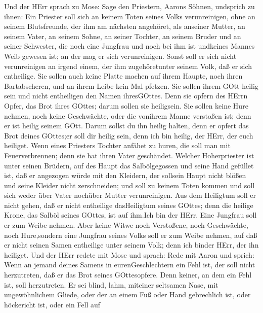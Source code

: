  Und der HErr sprach zu Mose: Sage den Priestern, Aarons
Söhnen, undsprich zu ihnen: Ein Priester soll sich an keinem Toten
seines Volks verunreinigen,  ohne an seinem Blutsfreunde,
der ihm am nächsten angehöret, als anseiner Mutter, an seinem Vater, an
seinem Sohne, an seiner Tochter, an seinem Bruder  und an
seiner Schwester, die noch eine Jungfrau und noch bei ihm ist undkeines
Mannes Weib gewesen ist; an der mag er sich verunreinigen. 
Sonst soll er sich nicht verunreinigen an irgend einem, der ihm
zugehöretunter seinem Volk, daß er sich entheilige.  Sie
sollen auch keine Platte machen auf ihrem Haupte, noch ihren
Bartabscheren, und an ihrem Leibe kein Mal pfetzen.  Sie
sollen ihrem GOtt heilig sein und nicht entheiligen den Namen
ihresGOttes. Denn sie opfern des HErrn Opfer, das Brot ihres GOttes;
darum sollen sie heiligsein.  Sie sollen keine Hure nehmen,
noch keine Geschwächte, oder die vonihrem Manne verstoßen ist; denn er
ist heilig seinem GOtt.  Darum sollst du ihn heilig halten,
denn er opfert das Brot deines GOttes;er soll dir heilig sein, denn ich
bin heilig, der HErr, der euch heiliget.  Wenn eines
Priesters Tochter anfähet zu huren, die soll man mit Feuerverbrennen;
denn sie hat ihren Vater geschändet.  Welcher Hoherpriester
ist unter seinen Brüdern, auf des Haupt das Salbölgegossen und seine
Hand gefüllet ist, daß er angezogen würde mit den Kleidern, der sollsein
Haupt nicht blößen und seine Kleider nicht zerschneiden; 
und soll zu keinem Toten kommen und soll sich weder über Vater nochüber
Mutter verunreinigen.  Aus dem Heiligtum soll er nicht
gehen, daß er nicht entheilige dasHeiligtum seines GOttes; denn die
heilige Krone, das Salböl seines GOttes, ist auf ihm.Ich bin der HErr.
 Eine Jungfrau soll er zum Weibe nehmen.  Aber
keine Witwe noch Verstoßene, noch Geschwächte, noch Hure,sondern eine
Jungfrau seines Volks soll er zum Weibe nehmen,  auf daß er
nicht seinen Samen entheilige unter seinem Volk; denn ich binder HErr,
der ihn heiliget.  Und der HErr redete mit Mose und sprach:
 Rede mit Aaron und sprich: Wenn an jemand deines Samens in
eurenGeschlechtern ein Fehl ist, der soll nicht herzutreten, daß er das
Brot seines GOttesopfere.  Denn keiner, an dem ein Fehl
ist, soll herzutreten. Er sei blind, lahm, miteiner seltsamen Nase, mit
ungewöhnlichem Gliede,  oder der an einem Fuß oder Hand
gebrechlich ist,  oder höckericht ist, oder ein Fell auf
